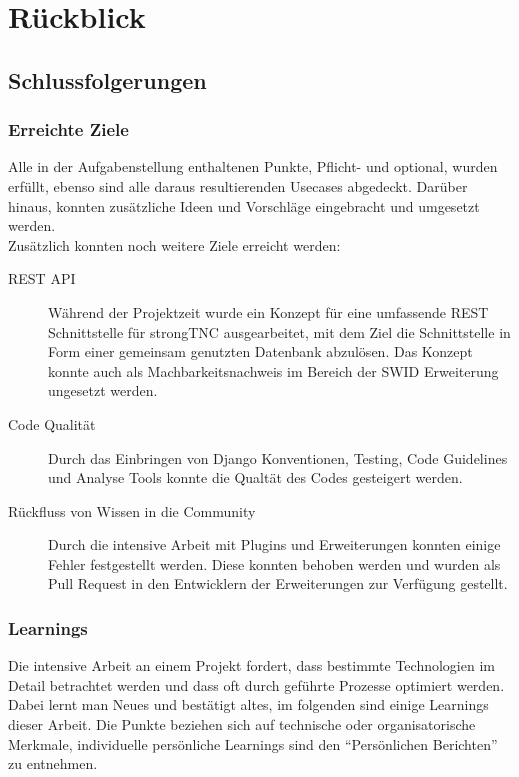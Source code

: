 \chapter{Rückblick}


\section{Schlussfolgerungen}

\subsection{Erreichte Ziele}
Alle in der Aufgabenstellung enthaltenen Punkte, Pflicht- und optional,  wurden
erfüllt, ebenso sind alle daraus resultierenden Usecases abgedeckt. Darüber
hinaus, konnten zusätzliche Ideen und Vorschläge eingebracht und umgesetzt
werden.\\
Zusätzlich konnten noch weitere Ziele erreicht werden:                 
\begin{description}                  
                                  
	\item[REST API] Während der Projektzeit wurde ein Konzept für eine umfassende
	REST Schnittstelle für strongTNC ausgearbeitet, mit dem Ziel die Schnittstelle
	in Form einer gemeinsam genutzten Datenbank abzulösen. Das Konzept konnte auch
	als Machbarkeitsnachweis im Bereich der SWID Erweiterung ungesetzt werden.
	
	\item[Code Qualität] Durch das Einbringen von Django Konventionen, Testing,
	Code Guidelines und Analyse Tools konnte die Qualtät des Codes gesteigert
	werden.
	
	\item[Rückfluss von Wissen in die Community] Durch die intensive Arbeit mit
	Plugins und Erweiterungen konnten einige Fehler festgestellt werden. Diese
	konnten behoben werden und wurden als Pull Request in den Entwicklern der
	Erweiterungen  zur Verfügung gestellt.
	
\end{description}


\subsection{Learnings}
Die intensive Arbeit an einem Projekt fordert, dass bestimmte Technologien im
Detail betrachtet werden und dass oft durch geführte Prozesse optimiert werden.
Dabei lernt man Neues und bestätigt altes, im folgenden sind einige Learnings
dieser Arbeit. Die Punkte beziehen sich auf technische oder organisatorische
Merkmale, individuelle persönliche Learnings sind den \enquote{Persönlichen
Berichten} zu entnehmen.

